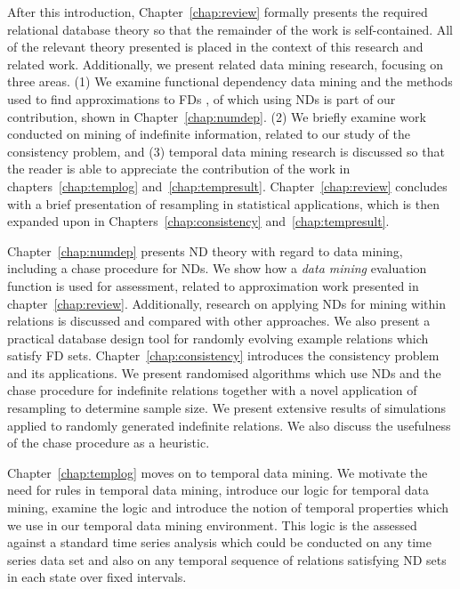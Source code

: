After this introduction, Chapter~\ref{chap:review} formally presents
the required relational database theory so that the remainder of the
work is self-contained.  All of the relevant theory presented is
placed in the context of this research and related work. Additionally,
we present related data mining research, focusing on three areas. (1)
We examine functional dependency data mining and the methods used to
find approximations to FDs \cite{km95,at94,Mann92,sf93,HS95,pk95,bel95b,psm93}, of which using NDs is part of our
contribution, shown in Chapter~\ref{chap:numdep}. (2) We briefly examine work conducted on mining of
indefinite information, related to our study of the consistency
problem, and (3) temporal data mining research is discussed so that
the reader is able to appreciate the contribution of the
work in chapters~\ref{chap:templog}
and~\ref{chap:tempresult}. Chapter~\ref{chap:review} concludes with a
brief presentation of
resampling in statistical applications, which is then expanded upon in
Chapters~\ref{chap:consistency} and~\ref{chap:tempresult}.

\medskip

Chapter~\ref{chap:numdep} presents ND theory with regard to data
mining, including a chase procedure for NDs. We show how a
{\em data mining} evaluation function is used for assessment, related
to approximation work presented in
chapter~\ref{chap:review}. Additionally, research on applying NDs for
mining within relations is discussed and compared with other
approaches. We also present a practical database design tool for randomly
evolving example relations which satisfy FD sets.  Chapter~\ref{chap:consistency} introduces
the consistency problem and its applications. We present randomised
algorithms which use NDs and the chase procedure for indefinite
relations together with a novel application of resampling to determine
sample size. We present extensive results of simulations applied to
randomly generated indefinite relations. We also discuss the
usefulness of the chase procedure as a heuristic.

\medskip

Chapter~\ref{chap:templog} moves on to temporal data mining. We
motivate the need for rules in temporal data mining, introduce our
logic for temporal data mining, examine the logic and introduce the
notion of temporal properties which we use in our temporal data mining
environment. This logic is the assessed against a standard time series
analysis which could be conducted on any time series data set and also
on any temporal sequence of relations satisfying ND sets in each
state over fixed intervals.

